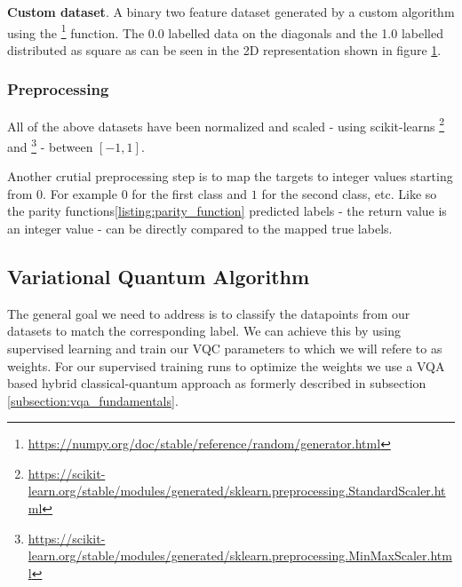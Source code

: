 \textbf{Custom dataset}. A binary two feature dataset generated by a custom algorithm using the \footnote{\url{https://numpy.org/doc/stable/reference/random/generator.html}} function. The 0.0 labelled data on the diagonals and the 1.0 labelled distributed as square as can be seen in the 2D representation shown in figure \ref{figure:custom_dataset}. 

\begin{figure}[!ht]
    \centering
    \caption{}
    \label{figure:custom_dataset}
\end{figure}



\subsubsection{Preprocessing}
All of the above datasets have been normalized and scaled - using scikit-learns  \footnote{\url{https://scikit-learn.org/stable/modules/generated/sklearn.preprocessing.StandardScaler.html}} and \footnote{\url{https://scikit-learn.org/stable/modules/generated/sklearn.preprocessing.MinMaxScaler.html}} - between $[-1, 1]$. 

Another crutial preprocessing step is to map the targets to integer values starting from $0$. For example $0$ for the first class and $1$ for the second class, etc. Like so the parity functions\ref{listing:parity_function} predicted labels - the return value is an integer value - can be directly compared to the mapped true labels.

\clearpage

\subsection{Variational Quantum Algorithm} 
The general goal we need to address is to classify the datapoints from our datasets to match the corresponding label. We can achieve this by using supervised learning and train our VQC parameters to which we will refere to as weights. For our supervised training runs to optimize the weights we use a VQA based hybrid classical-quantum approach as formerly described in subsection \ref{subsection:vqa_fundamentals}. 

